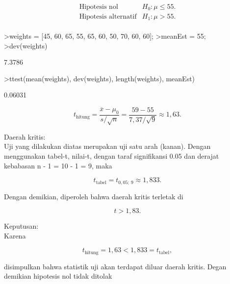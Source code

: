 \documentclass[a4paper,10pt]{article}
\begin{document}
\begin{eulernotebook}
\begin{eulercomment}
\begin{eulercomment}
\begin{eulercomment}
\begin{eulercomment}
\begin{eulercomment}
\begin{eulercomment}
\begin{eulercomment}
\end{eulercomment}
\begin{eulerformula}
\[
\begin{array}{cc} \text{Hipotesis nol} & H_0: \mu\le 55. \\ \text{Hipotesis alternatif} & H_1: \mu > 55. \\ \end{array}
\]
\end{eulerformula}
\begin{eulerprompt}
>weights = [45, 60,  65, 55, 65, 60, 50, 70, 60, 60];
>meanEst = 55;
>dev(weights)
\end{eulerprompt}
\begin{euleroutput}
  7.3786
\end{euleroutput}
\begin{eulerprompt}
>ttest(mean(weights), dev(weights), length(weights), meanEst)
\end{eulerprompt}
\begin{euleroutput}
  0.06031
\end{euleroutput}
\begin{eulerformula}
\[
t_{\text{hitung}} = \dfrac{\overline{x}-\mu_0}{s/\sqrt{n}} = \dfrac{59-55}{7,\!37/\sqrt{9}} \approx 1,\!63.
\]
\end{eulerformula}
\begin{eulercomment}
Daerah kritis:\\
Uji yang dilakukan diatas merupakan uji satu arah (kanan). Dengan
menggunakan tabel-t, nilai-t, dengan taraf signifikansi 0.05 dan
derajat kebabasan n - 1 = 10 - 1 = 9, maka

\end{eulercomment}
\begin{eulerformula}
\[
t_{\text{tabel}} = t_{0,05; ~9} \approx 1,\!833.
\]
\end{eulerformula}
\begin{eulercomment}
Dengan demikian, diperoleh bahwa daerah kritis terletak  di

\end{eulercomment}
\begin{eulerformula}
\[
t > 1,\!83.
\]
\end{eulerformula}
\begin{eulercomment}
Keputusan:\\
Karena\\
\end{eulercomment}
\begin{eulerformula}
\[
t_{\text{hitung}} = 1,\!63 < 1,\!833 = t_{\text{tabel}},
\]
\end{eulerformula}
\begin{eulercomment}
disimpulkan bahwa statistik uji akan terdapat diluar daerah kritis.
Degan demikian hipotesis nol tidak ditolak


\end{eulercomment}
\end{eulercomment}
\end{eulercomment}
\end{eulercomment}
\end{eulercomment}
\end{eulercomment}
\end{eulercomment}
\end{eulernotebook}
\end{document}
